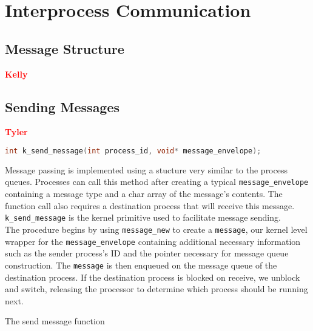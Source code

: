 \documentclass[12pt]{report}
\begin{document}

\section{Interprocess Communication}

\subsection{Message Structure}

\textcolor{red}{\textbf{Kelly}} \\


\subsection{Sending Messages}

\textcolor{red}{\textbf{Tyler}} \\
\begin{minipage}{\textwidth}
\begin{lstlisting}[language=C, frame=single]
int k_send_message(int process_id, void* message_envelope);
\end{lstlisting}
\end{minipage}

Message passing is implemented using a stucture very similar to the process queues. Processes can call this method after creating a typical {\tt message_envelope} containing a message type and a char array of the message's contents. The function call also requires a destination process that will receive this message. {\tt k\_send\_message} is the kernel primitive used to facilitate message sending.\\

The procedure begins by using {\tt message\_new} to create a {\tt message}, our kernel level wrapper for the {\tt message_envelope} containing additional necessary information such as the sender process's ID and the pointer necessary for message queue construction. The {\tt message} is then enqueued on the message queue of the destination process. If the destination process is blocked on receive, we unblock and switch, releasing the processor to determine which process should be running next. \\

\begin{algorithm}
  \caption{The send message function}
  \begin{algorithmic}[1]
      
		\EndIf
    \EndProcedure
  \end{algorithmic}
\end{algorithm}
\end{document}
